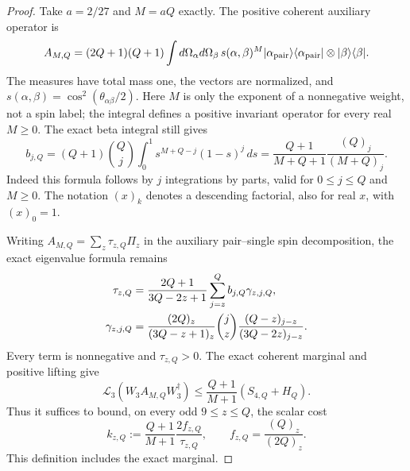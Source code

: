 \begin{proof}
Take $a=2/27$ and $M=aQ$ exactly. The positive coherent auxiliary operator is
\begin{equation}
 A_{M,Q}=(2Q+1)(Q+1)\int d\Omega_\alpha d\Omega_\beta\,
 s(\alpha,\beta)^M
 |\alpha_{\rm pair}\rangle\langle\alpha_{\rm pair}|
 \otimes|\beta\rangle\langle\beta|.
\end{equation}
The measures have total mass one, the vectors are normalized, and
$s(\alpha,\beta)=\cos^2(\theta_{\alpha\beta}/2)$.
Here $M$ is only the exponent of a nonnegative weight, not a spin label;
the integral defines a positive invariant operator for every real $M\ge0$.
The exact beta integral still gives
\begin{equation}
 b_{j,Q}=(Q+1)\binom Qj\int_0^1s^{M+Q-j}(1-s)^j\,ds
 =\frac{Q+1}{M+Q+1}\frac{(Q)_j}{(M+Q)_j}.
\end{equation}
Indeed this formula follows by $j$ integrations by parts, valid for
$0\le j\le Q$ and $M\ge0$. The notation $(x)_k$ denotes a descending
factorial, also for real $x$, with $(x)_0=1$.

Writing $A_{M,Q}=\sum_z\tau_{z,Q}\Pi_z$ in the auxiliary pair--single
spin decomposition, the exact eigenvalue formula remains
\begin{align}
 \tau_{z,Q}&=\frac{2Q+1}{3Q-2z+1}
                 \sum_{j=z}^Q b_{j,Q}\gamma_{z,j,Q},\notag\\
 \gamma_{z,j,Q}&=\frac{(2Q)_z}{(3Q-z+1)_z}
                 \binom jz\frac{(Q-z)_{j-z}}{(3Q-2z)_{j-z}}.
 \label{eq:optimized-tail-eigenvalue}
\end{align}
Every term is nonnegative and $\tau_{z,Q}>0$. The exact coherent marginal
and positive lifting give
\begin{equation}
 \mathcal L_3(W_3A_{M,Q}W_3^\dagger)
 \le\frac{Q+1}{M+1}(S_{4,Q}+H_Q).
\end{equation}
Thus it suffices to bound, on every odd $9\le z\le Q$, the scalar cost
\begin{equation}\label{eq:optimized-tail-cost}
 k_{z,Q}:=\frac{Q+1}{M+1}\frac{2f_{z,Q}}{\tau_{z,Q}},
 \qquad f_{z,Q}=\frac{(Q)_z}{(2Q)_z}.
\end{equation}
This definition includes the exact marginal.


\end{proof}
